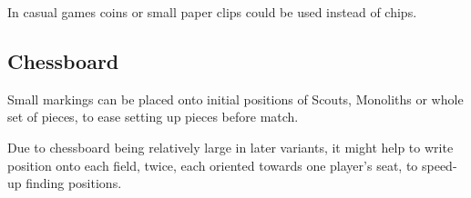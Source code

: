In casual games coins or small paper clips could be used instead of chips.

\subsection*{Chessboard}
\label{sec:Remarks/Well-defined game/Chessboard}

Small markings can be placed onto initial positions of Scouts, Monoliths
or whole set of pieces, to ease setting up pieces before match.

Due to chessboard being relatively large in later variants, it might help to
write  position onto each field, twice, each oriented towards one
player's seat, to speed-up finding positions.

\clearpage %
